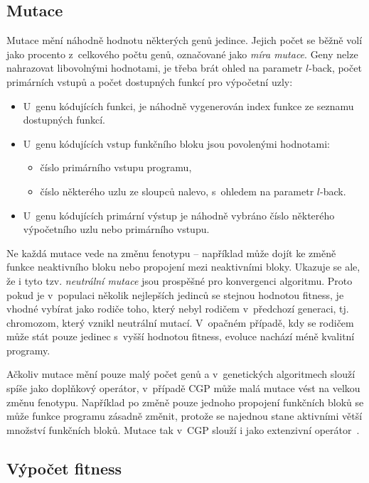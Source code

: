 \subsection{Mutace}

Mutace mění náhodně hodnotu některých genů jedince. Jejich počet se běžně volí jako procento z~celkového počtu genů, označované jako \emph{míra mutace}. Geny nelze nahrazovat libovolnými hodnotami, je třeba brát ohled na parametr $l$-back, počet primárních vstupů a počet dostupných funkcí pro výpočetní uzly:

\begin{itemize}
    \item U~genu kódujících funkci, je náhodně vygenerován index funkce ze seznamu dostupných funkcí.
    \item U~genu kódujících vstup funkčního bloku jsou povolenými hodnotami:
        \begin{itemize}
            \item číslo primárního vstupu programu,
            \item číslo některého uzlu ze sloupců nalevo, s~ohledem na parametr $l$-back.
        \end{itemize}
    \item U~genu kódujících primární výstup je náhodně vybráno číslo některého výpočetního uzlu nebo primárního vstupu.
\end{itemize}

Ne každá mutace vede na změnu fenotypu -- například může dojít ke změně funkce neaktivního bloku nebo propojení mezi neaktivními bloky. Ukazuje se ale, že i tyto tzv. \emph{neutrální mutace} jsou prospěšné pro konvergenci algoritmu. Proto pokud je v~populaci několik nejlepších jedinců se stejnou hodnotou fitness, je vhodné vybírat jako rodiče toho, který nebyl rodičem v~předchozí generaci, tj. chromozom, který vznikl neutrální mutací. V~opačném případě, kdy se rodičem může stát pouze jedinec s~vyšší hodnotou fitness, evoluce nachází méně kvalitní programy.

Ačkoliv mutace mění pouze malý počet genů a v~genetických algoritmech slouží spíše jako doplňkový operátor, v~případě CGP může malá mutace vést na velkou změnu fenotypu. Například po změně pouze jednoho propojení funkčních bloků se může funkce programu zásadně změnit, protože se najednou stane aktivními větší množství funkčních bloků. Mutace tak v~CGP slouží i jako extenzivní operátor~\cite{ZelenaCGP, Modra}.

\subsection{Výpočet fitness}
\label{secFitnessCalc}

